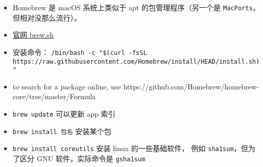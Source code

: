 
\begin{issues}
\issueDraft
\end{issues}

\begin{itemize}
\item Homebrew 是 macOS 系统上类似于 apt 的包管理程序（另一个是 \verb|MacPorts|，但相对没那么流行）。
\item \href{https://brew.sh}{官网 brew.sh}
\item 安装命令： \verb|/bin/bash -c "$(curl -fsSL https://raw.githubusercontent.com/Homebrew/install/HEAD/install.sh)"|
\item to search for a package online, use https://github.com/Homebrew/homebrew-core/tree/master/Formula
\item \verb`brew update` 可以更新 app 索引
\item \verb`brew install 包名` 安装某个包
\item \verb`brew install coreutils` 安装 linux 的一些基础软件， 例如 \verb`sha1sum`，但为了区分 GNU 软件，实际命令是 \verb`gsha1sum`
\end{itemize}
